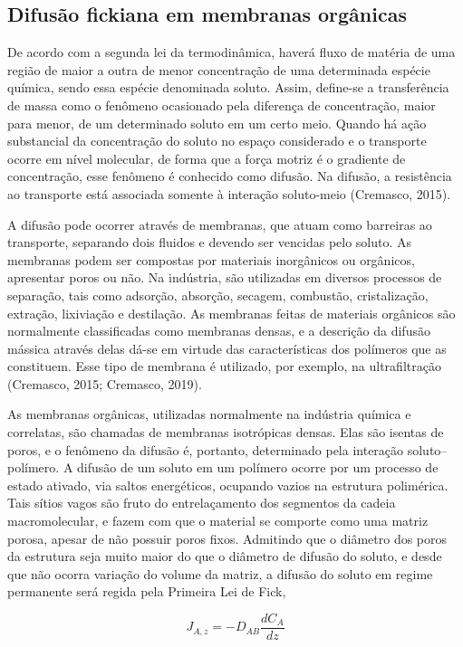 \subsection{Difusão fickiana em membranas orgânicas}

De acordo com a segunda lei da termodinâmica, haverá fluxo de matéria de uma região de maior a outra de menor concentração de uma determinada espécie química, sendo essa espécie denominada soluto. Assim, define-se a transferência de massa como o fenômeno ocasionado pela diferença de concentração, maior para menor, de um determinado soluto em um certo meio. Quando há ação substancial da concentração do soluto no espaço considerado e o transporte ocorre em nível molecular, de forma que a força motriz é o gradiente de concentração, esse fenômeno é conhecido como difusão. Na difusão, a resistência ao transporte está associada somente à interação soluto-meio (Cremasco, 2015).

A difusão pode ocorrer através de membranas, que atuam como barreiras ao transporte, separando dois fluidos e devendo ser vencidas pelo soluto. As membranas podem ser compostas por materiais inorgânicos ou orgânicos, apresentar poros ou não. Na indústria, são utilizadas em diversos processos de separação, tais como adsorção, absorção, secagem, combustão, cristalização, extração, lixiviação e destilação. As membranas feitas de materiais orgânicos são normalmente classificadas como membranas densas, e a descrição da difusão mássica através delas dá-se em virtude das características dos polímeros que as constituem. Esse tipo de membrana é utilizado, por exemplo, na ultrafiltração (Cremasco, 2015; Cremasco, 2019).

As membranas orgânicas, utilizadas normalmente na indústria química e correlatas, são chamadas de membranas isotrópicas densas. Elas são isentas de poros, e o fenômeno da difusão é, portanto, determinado pela interação soluto–polímero. A difusão de um soluto em um polímero ocorre por um processo de estado ativado, via saltos energéticos, ocupando vazios na estrutura polimérica. Tais sítios vagos são fruto do entrelaçamento dos segmentos da cadeia macromolecular, e fazem com que o material se comporte como uma matriz porosa, apesar de não possuir poros fixos. Admitindo que o diâmetro dos poros da estrutura seja muito maior do que o diâmetro de difusão do soluto, e desde que não ocorra variação do volume da matriz, a difusão do soluto em regime permanente será regida pela Primeira Lei de Fick,

\begin{equation}
J_{A,z} = -D_{AB} \frac{dC_A}{dz}
\end{equation}

